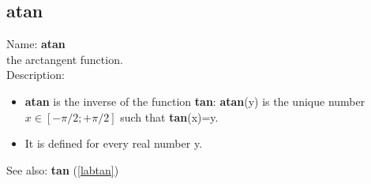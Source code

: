 \subsection{atan}
\label{labatan}
\noindent Name: \textbf{atan}\\
the arctangent function.\\

\noindent Description: \begin{itemize}

\item \textbf{atan} is the inverse of the function \textbf{tan}: \textbf{atan}(y) is the unique number 
   $x \in [-\pi/2; +\pi/2]$ such that \textbf{tan}(x)=y.

\item It is defined for every real number y.
\end{itemize}
See also: \textbf{tan} (\ref{labtan})
